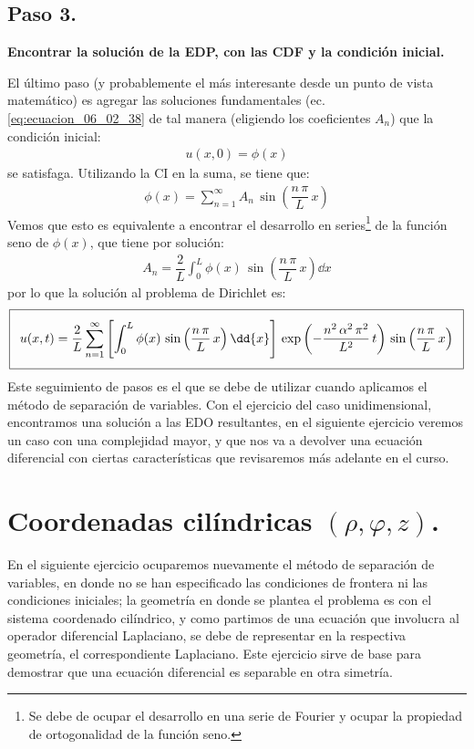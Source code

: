 \subsection{Paso 3.}
\textbf{Encontrar la solución de la EDP, con las CDF y la condición inicial.}

El último paso (y probablemente el más interesante desde un punto de vista matemático) es agregar las soluciones fundamentales (ec. \ref{eq:ecuacion_06_02_38} de tal manera (eligiendo los coeficientes $A_{n}$) que la condición inicial:
\begin{align*}
u(x, 0) = \phi (x)
\end{align*}
se satisfaga. Utilizando la CI en la suma, se tiene que:
\begin{align*}
\phi (x) = \sum_{n=1}^{\infty} A_{n} \, \sin \left( \dfrac{n \, \pi}{L} \, x \right)
\end{align*}
Vemos que esto es equivalente a encontrar el desarrollo en series\footnote{Se debe de ocupar el desarrollo en una serie de Fourier y ocupar la propiedad de ortogonalidad de la función seno.} de la función seno de $\phi (x)$, que tiene por solución:
\begin{align}
A_{n} = \dfrac{2}{L} \int_{0}^{L} \phi (x) \, \sin \left( \dfrac{n \, \pi}{L} \, x \right) \dd{x}
\label{eq:ecuacion_06_02_40}    
\end{align}
por lo que la solución al problema de Dirichlet es:
{\fontsize{12}{12}\selectfont
\begin{align}
\addtolength{\fboxsep}{5pt}\boxed{
u (x, t) = \dfrac{2}{L} \sum_{n=1}^{\infty} \left[ \int_{0}^{L} \phi (x) \, \sin \left( \dfrac{n \, \pi}{L} \, x \right) \dd{x} \right] \, \exp \left( - \dfrac{n^{2} \, \alpha^{2} \, \pi^{2}}{L^{2}} \, t \right) \, \sin \left( \dfrac{n \, \pi}{L} \, x \right)}
\label{eq:ecuacion_06_02_41}    
\end{align}}
Este seguimiento de pasos es el que se debe de utilizar cuando aplicamos el método de separación de variables. Con el ejercicio del caso unidimensional, encontramos una solución a las EDO resultantes, en el siguiente ejercicio veremos un caso con una complejidad mayor, y que nos va a devolver una ecuación diferencial con ciertas características que revisaremos más adelante en el curso.
\section{Coordenadas cilíndricas $(\rho, \varphi, z)$.}
En el siguiente ejercicio ocuparemos nuevamente el método de separación de variables, en donde no se han especificado las condiciones de frontera ni las condiciones iniciales; la geometría en donde se plantea el problema es con el sistema coordenado cilíndrico, y como partimos de una ecuación que involucra al operador diferencial Laplaciano, se debe de representar en la respectiva geometría, el correspondiente Laplaciano. Este ejercicio sirve de base para demostrar que una ecuación diferencial es separable en otra simetría.
